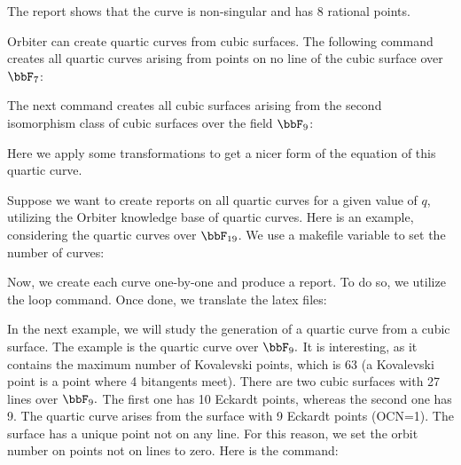 
The report shows that 
the curve is non-singular and has 8 rational points.

\bigskip




Orbiter can create quartic curves from cubic surfaces. 
The following command creates all quartic curves 
arising from points on no line of the cubic surface over $\bbF_7$:


\bigskip




\bigskip

The next command creates all cubic surfaces arising from 
the second isomorphism class of cubic surfaces over the field $\bbF_9$:



\bigskip






Here we apply some transformations to get a nicer form of the equation of this quartic curve. 




\bigskip



\bigskip


Suppose we want to create reports on all quartic curves for a given value of $q$, 
utilizing the Orbiter knowledge base of quartic curves.
Here is an example, considering the quartic curves over $\bbF_{19}$. 
We use a makefile variable to set the number of curves:


Now, we create each curve one-by-one and produce a report. 
To do so, we utilize the loop command. 
Once done, we translate the latex files:




\bigskip

In the next example, we will study the generation 
of a quartic curve from a cubic surface. 
The example is the quartic curve over $\bbF_9.$ 
It is interesting, as it contains the maximum number of Kovalevski points, 
which is 63 (a Kovalevski point is a point where 4 bitangents meet). 
There are two cubic surfaces with 27 lines over $\bbF_9.$ 
The first one has 10 Eckardt points, 
whereas the second one has 9. 
The quartic curve arises from the surface with 9 Eckardt points (OCN=1). 
The surface has a unique point not on any line. 
For this reason, we set the orbit number 
on points not on lines to zero. Here is the command:

